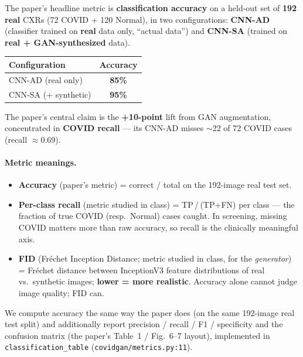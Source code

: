\documentclass[11pt]{article}
\newcommand{\code}[1]{\texttt{#1}}
\begin{document}
The paper's headline metric is \textbf{classification accuracy} on a held-out set
of \textbf{192 real} CXRs (72 COVID + 120 Normal), in two configurations:
\textbf{CNN-AD} (classifier trained on \textbf{real} data only, ``actual data'')
and \textbf{CNN-SA} (trained on \textbf{real + GAN-synthesized} data).

\begin{table}[htbp]
\centering
\begin{tabular}{@{}lc@{}}
\toprule
\textbf{Configuration} & \textbf{Accuracy} \\
\midrule
CNN-AD (real only) & \textbf{85\%} \\
CNN-SA (+ synthetic) & \textbf{95\%} \\
\bottomrule
\end{tabular}
\end{table}

The paper's central claim is the \textbf{+10-point} lift from GAN augmentation,
concentrated in \textbf{COVID recall} --- its CNN-AD misses $\sim$22 of 72 COVID
cases (recall $\approx 0.69$).

\paragraph{Metric meanings.}
\begin{itemize}[nosep,leftmargin=1.4em]
  \item \textbf{Accuracy} (paper's metric) = correct / total on the 192-image real
        test set.
  \item \textbf{Per-class recall} (metric studied in class) = TP\,/\,(TP+FN) per
        class --- the fraction of true COVID (resp.\ Normal) cases caught. In
        screening, missing COVID matters more than raw accuracy, so recall is the
        clinically meaningful axis.
  \item \textbf{FID} (Fr\'echet Inception Distance; metric studied in class, for
        the \emph{generator}) = Fr\'echet distance between InceptionV3 feature
        distributions of real vs.\ synthetic images; \textbf{lower = more
        realistic}. Accuracy alone cannot judge image quality; FID can.
\end{itemize}

We compute accuracy the same way the paper does (on the same 192-image real test
split) and additionally report precision / recall / F1 / specificity and the
confusion matrix (the paper's Table~1 / Fig.~6--7 layout), implemented in
\code{classification\_table} (\code{covidgan/metrics.py:11}).
\end{document}

